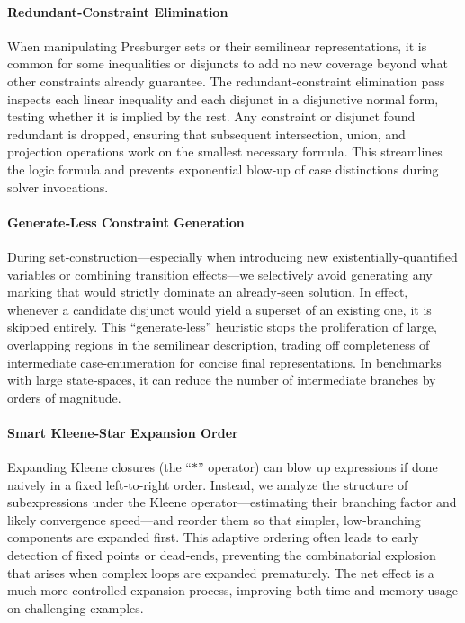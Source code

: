\paragraph{Redundant‐Constraint Elimination}
When manipulating Presburger sets or their semilinear representations, it is common for some inequalities or disjuncts to add no new coverage beyond what other constraints already guarantee.  The redundant‐constraint elimination pass inspects each linear inequality and each disjunct in a disjunctive normal form, testing whether it is implied by the rest.  Any constraint or disjunct found redundant is dropped, ensuring that subsequent intersection, union, and projection operations work on the smallest necessary formula.  This streamlines the logic formula and prevents exponential blow‐up of case distinctions during solver invocations.

\paragraph{Generate‐Less Constraint Generation}
During set‐construction—especially when introducing new existentially‐quantified variables or combining transition effects—we selectively avoid generating any marking that would strictly dominate an already‐seen solution.  In effect, whenever a candidate disjunct would yield a superset of an existing one, it is skipped entirely.  This “generate‐less” heuristic stops the proliferation of large, overlapping regions in the semilinear description, trading off completeness of intermediate case‐enumeration for concise final representations.  In benchmarks with large state‐spaces, it can reduce the number of intermediate branches by orders of magnitude.

\paragraph{Smart Kleene‐Star Expansion Order}
Expanding Kleene closures (the “\(\mathsf{*}\)” operator) can blow up expressions if done naively in a fixed left‐to‐right order.  Instead, we analyze the structure of subexpressions under the Kleene operator—estimating their branching factor and likely convergence speed—and reorder them so that simpler, low‐branching components are expanded first.  This adaptive ordering often leads to early detection of fixed points or dead‐ends, preventing the combinatorial explosion that arises when complex loops are expanded prematurely.  The net effect is a much more controlled expansion process, improving both time and memory usage on challenging examples.


